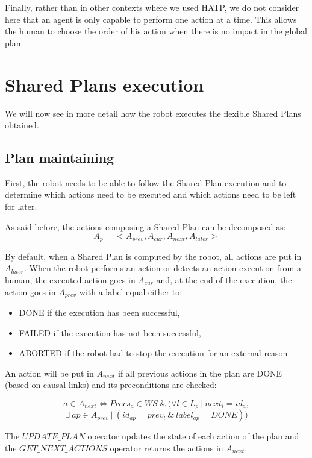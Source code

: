 \documentclass[english,a4paper,11pt,twoside]{StyleThese}
\begin{document}
Finally, rather than in other contexts where we used HATP, we do not consider here that an agent is only capable to perform one action at a time. This allows the human to choose the order of his action when there is no impact in the global plan.

\section{Shared Plans execution}

We will now see in more detail how the robot executes the flexible Shared Plans obtained.

\subsection{Plan maintaining}
\label{subsec:maintaining}

First, the robot needs to be able to follow the Shared Plan execution and to determine which actions need to be executed and which actions need to be left for later. 

As said before, the actions composing a Shared Plan can be decomposed as:
$$A_p = <A_{prev}, A_{cur}, A_{next}, A_{later}>$$

By default, when a Shared Plan is computed by the robot, all actions are put in $A_{later}$. When the robot performs an action or detects an action execution from a human, the executed action goes in $A_{cur}$ and, at the end of the execution, the action goes in $A_{prev}$ with a label equal either to:
\begin{itemize}
\item DONE if the execution has been successful,
\item FAILED if the execution has not been successful,
\item ABORTED if the robot had to stop the execution for an external reason.
\end{itemize}

An action will be put in $A_{next}$ if all previous actions in the plan are DONE (based on causal links) and its preconditions are checked:

$$a \in A_{next} \Leftrightarrow Precs_{a} \in WS \ \& \ (\forall l \in L_p \ | \ next_l = id_a,$$ 
$$\exists \ ap \in A_{prev} \ | \ (id_{ap} = prev_l \ \& \ label_{ap}  = DONE))$$

The $UPDATE\_PLAN$ operator updates the state of each action of the plan and the $GET\_NEXT\_ACTIONS$ operator returns the actions in $A_{next}$.
\end{document}
